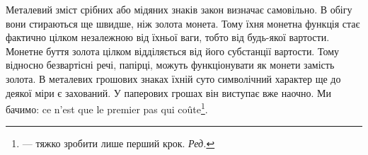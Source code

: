 Металевий зміст срібних або мідяних знаків закон визначає
самовільно. В обігу вони стираються ще швидше, ніж золота
монета. Тому їхня монетна функція стає фактично цілком незалежною
від їхньої ваги, тобто від будь-якої вартости. Монетне
буття золота цілком відділяється від його субстанції вартости.
Тому відносно безвартісні речі, папірці, можуть функціонувати
як монети замість золота. В металевих грошових знаках їхній
суто символічний характер ще до деякої міри є захований. У паперових
грошах він виступає вже наочно. Ми бачимо: ce n’est que
le premier pas qui coûte\footnote*{
— тяжко зробити лише перший крок. \emph{Ред.}
}.
